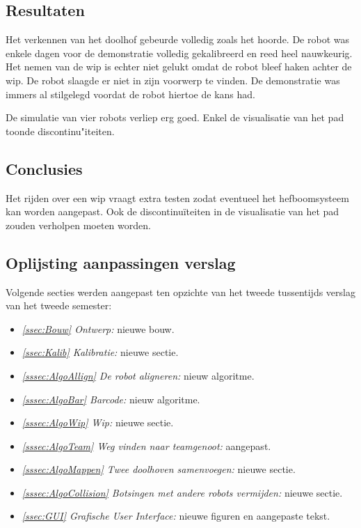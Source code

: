 \documentclass[eind]{penoverslag}
\begin{document}
\subsection{Resultaten}
\label{Assec:result2}
Het verkennen van het doolhof gebeurde volledig zoals het hoorde. De robot was enkele dagen voor de demonstratie volledig gekalibreerd en reed heel nauwkeurig. Het nemen van de wip is echter niet gelukt omdat de robot bleef haken achter de wip.
De robot slaagde er niet in zijn voorwerp te vinden. De demonstratie was immers al stilgelegd voordat de robot hiertoe de kans had.

De simulatie van vier robots verliep erg goed. Enkel de visualisatie van het pad toonde discontinu"iteiten.

\subsection{Conclusies}
\label{Assec:conc2}
Het rijden over een wip vraagt extra testen zodat eventueel het hefboomsysteem kan worden aangepast. Ook de discontinu\"iteiten in de visualisatie van het pad zouden verholpen moeten worden.

\subsection{Oplijsting aanpassingen verslag}
\label{Assec:aanp2}
Volgende secties werden aangepast ten opzichte van het tweede tussentijds verslag van het tweede semester:

\begin{itemize}
\item \textit{\ref{ssec:Bouw} Ontwerp:} nieuwe bouw.
\item \textit{\ref{ssec:Kalib} Kalibratie:} nieuwe sectie.
\item \textit{\ref{sssec:AlgoAllign} De robot aligneren:} nieuw algoritme.
\item \textit{\ref{sssec:AlgoBar} Barcode:} nieuw algoritme.
\item \textit{\ref{sssec:AlgoWip} Wip:} nieuwe sectie.
\item \textit{\ref{sssec:AlgoTeam} Weg vinden naar teamgenoot:} aangepast.
\item \textit{\ref{sssec:AlgoMappen} Twee doolhoven samenvoegen:} nieuwe sectie.
\item \textit{\ref{sssec:AlgoCollision} Botsingen met andere robots vermijden:} nieuwe sectie.
\item \textit{\ref{ssec:GUI} Grafische User Interface:} nieuwe figuren en aangepaste tekst.
\end{itemize}
\end{document}

